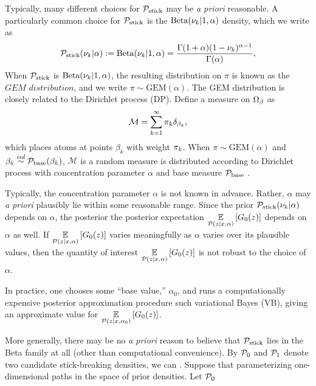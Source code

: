 Typically, many different choices for $\mathcal{P}_{\mathrm{stick}}$ may be {\em a priori}
reasonable.  A particularly common choice for $\mathcal{P}_{\mathrm{stick}}$ is the
$\mathrm{Beta}(\nu_{k} \vert 1, \alpha)$ density, which we write as
%
\begin{align*}
%
\pstick(\nuk \vert \alpha) :=
\mathrm{Beta}(\nuk \vert 1, \alpha) =
    \frac{\Gamma(1 + \alpha) (1 - \nuk)^{\alpha - 1}}
         {\Gamma(\alpha)},
%
\end{align*}
%
When $\mathcal{P}_{\mathrm{stick}}$ is $\mathrm{Beta}(\nu_{k} \vert 1, \alpha)$, the resulting
distribution on $\pi$ is known as the $\textit{GEM distribution}$, and we write
$\pi \sim \mathrm{GEM}(\alpha)$.
%
The GEM distribution is closely related to the Dirichlet process (DP).
Define a measure on $\Omega_{\beta}$ as
%
\begin{align*}
  \mathcal{M} = \sum_{k = 1}^\infty \pi_k\delta_{\beta_k},
\end{align*}
%
which places atoms at points $\beta_k$ with weight $\pi_k$. When $\pi \sim
\mathrm{GEM}(\alpha)$ and $\beta_k \overset{iid}{\sim} \mathcal{P}_{\mathrm{base}}(\beta_k)$, $\mathcal{M}$
is a random measure is distributed according to Dirichlet process with
concentration parameter $\alpha$ and base measure $\mathcal{P}_{\mathrm{base}}$
\citep{ferguson:1973:bayesian, sethuraman:1994:constructivedp}.

Typically, the concentration parameter $\alpha$ is not known in advance.
Rather, $\alpha$ may {\em a priori} plausibly lie within some reasonable range.
Since the prior $\mathcal{P}_{\mathrm{stick}}(\nu_{k} \vert \alpha)$ depends on $\alpha$, the posterior
the posterior expectation $\underset{\mathcal{P}(z \vert x, \alpha)}{\mathbb{E}}\left[G_0(z)\right]$
depends on $\alpha$ as well.  If $\underset{\mathcal{P}(z \vert x,
\alpha)}{\mathbb{E}}\left[G_0(z)\right]$ varies meaningfully as $\alpha$ varies over its
plausible values, then the quantity of interest $\underset{\mathcal{P}(z \vert x,
\alpha)}{\mathbb{E}}\left[G_0(z)\right]$ is not robust to the choice of $\alpha$.

In practice, one chooses some ``base value,'' $\alpha_0$, and runs a
computationally expensive posterior approximation procedure such variational
Bayes (VB), giving an approximate value for $\underset{\mathcal{P}(z \vert x,
\alpha_0)}{\mathbb{E}}\left[G_0(z)\right]$.


More generally, there may be no {\em a priori} reason to believe that $\mathcal{P}_{\mathrm{stick}}$
lies in the Beta family at all (other than computational convenience). By
$\mathcal{P}_{0}$ and $\mathcal{P}_{1}$ denote two candidate stick-breaking densities, we can
. Suppose that
parameterizing one-dimensional paths in the space of prior densities.  Let
$\mathcal{P}_{0}$


%
%
%
%
%
%
